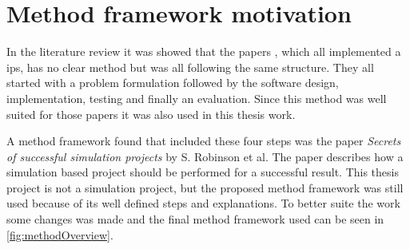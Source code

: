 \section{Method framework motivation}\label{sec:methodFramework}

In the literature review it was showed that the papers \cite{BluetoothLowEnergy2018, DevelopmentSmartphoneBasedUniversity2021, PracticalFingerprintingLocalization2017}, which all implemented a \acrfull{ips}, has no clear method but was all following the same structure.
They all started with a problem formulation followed by the software design, implementation, testing and finally an evaluation.
Since this method was well suited for those papers it was also used in this thesis work.

\bigskip

A method framework found that included these four steps was the paper \textit{Secrets of successful simulation projects} \cite{SecretsSuccessfulSimulation1995} by S. Robinson et al.
The paper describes how a simulation based project should be performed for a successful result.
This thesis project is not a simulation project, but the proposed method framework  was still used because of its well defined steps and explanations.
To better suite the work some changes was made and the final method framework used can be seen in \cref{fig:methodOverview}.



